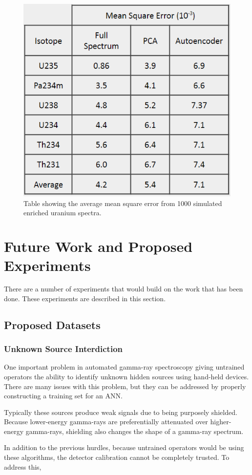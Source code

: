 \documentclass[tocnosub,noragright,centerchapter,12pt,fullpage]{uiucecethesis09}
\begin{document}
\begin{figure}[H]
    \centering
    \includegraphics[width=0.5\linewidth]{images/enrichment_MSE_table}
    \caption{Table showing the average mean square error from 1000 simulated enriched uranium spectra.}
    \label{fig:enrichment_MSE_table}
\end{figure}



\chapter{Future Work and Proposed Experiments}

There are a number of experiments that would build on the work that has been done. These experiments are described in this section.

\section{Proposed Datasets}

\subsection{Unknown Source Interdiction}

One important problem in automated gamma-ray spectroscopy giving untrained operators the ability to identify unknown hidden sources using hand-held devices. There are many issues with this problem, but they can be addressed by properly constructing a training set for an ANN.

Typically these sources produce weak signals due to being purposely shielded. Because lower-energy gamma-rays are preferentially attenuated over higher-energy gamma-rays, shielding also changes the shape of a gamma-ray spectrum. 

In addition to the previous hurdles, because untrained operators would be using these algorithms, the detector calibration cannot be completely trusted. To address this, 
\end{document}
